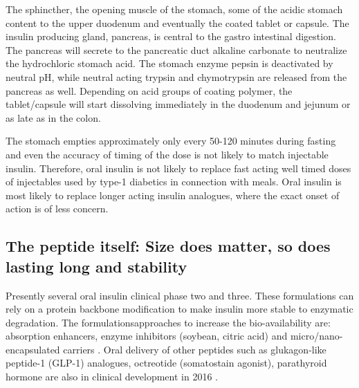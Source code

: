 The sphincther, the opening muscle of the stomach, \DIFdelbegin {}\DIFdelend \DIFaddbegin {}\DIFaddend some of the acidic stomach content to the upper duodenum and eventually the coated tablet or capsule. The insulin producing gland, \DIFaddbegin {}\DIFaddend pancreas, is central to the gastro intestinal digestion. The pancreas will secrete to the pancreatic duct alkaline carbonate to neutralize the hydrochloric stomach acid. The stomach enzyme pepsin is deactivated by neutral pH, while neutral acting trypsin and chymotrypsin are released from the pancreas as well. Depending on \DIFdelbegin {}\DIFdelend \DIFaddbegin {}\DIFaddend acid groups of \DIFaddbegin {}\DIFaddend coating polymer, the tablet/capsule will start dissolving immediately in the duodenum and jejunum or as late as in the colon.

The stomach empties approximately only every 50-120 minutes during fasting and even \DIFdelbegin {}\DIFdelend \DIFaddbegin {}\DIFaddend the accuracy of timing of the dose is not likely to match injectable insulin. Therefore, oral insulin is not likely to replace fast acting well timed doses of injectables used by type-1 diabetics in connection with meals. Oral insulin is most likely to replace longer acting insulin analogues, where the exact onset of action is of less concern.

\subsection{The peptide itself: Size does matter, so does lasting long and stability}
Presently several oral insulin \DIFdelbegin {}\DIFdelend \DIFaddbegin {}\DIFaddend clinical phase two and three. These formulations can rely on a protein backbone modification to make insulin \DIFdelbegin {}\DIFdelend \DIFaddbegin {}\DIFaddend more stable to enzymatic degradation. The formulations\DIFaddbegin {}\DIFaddend approaches to increase the bio-availability are: absorption enhancers, enzyme inhibitors (soybean, citric acid) and micro/nano-encapsulated carriers \cite{aguirre2016current}. Oral delivery of other peptides such as glukagon-like peptide-1 (GLP-1) analogues, octreotide (somatostain agonist), parathyroid hormone are also in clinical development in 2016 \cite{aguirre2016current}.

